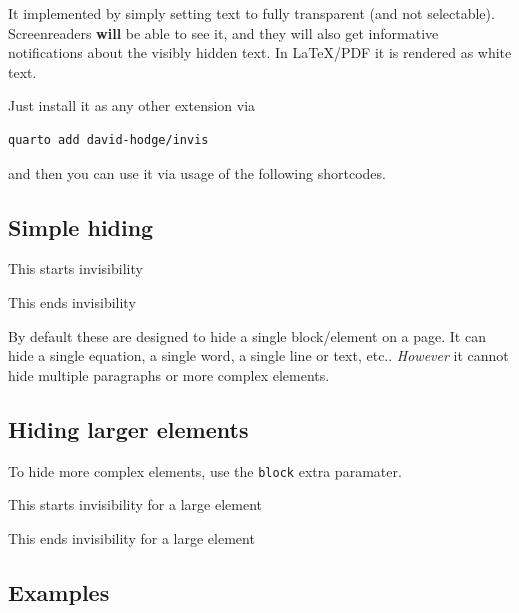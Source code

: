 \documentclass[
  a4paper,
  DIV=11,
  numbers=noendperiod,
  oneside]{scrreport}
\providecommand{\tightlist}{%
  \setlength{\itemsep}{0pt}\setlength{\parskip}{0pt}}
\begin{document}
It implemented by simply setting text to fully transparent (and not
selectable). Screenreaders \textbf{will} be able to see it, and they
will also get informative notifications about the visibly hidden text.
In LaTeX/PDF it is rendered as white text.

Just install it as any other extension via

\begin{verbatim}
quarto add david-hodge/invis
\end{verbatim}

and then you can use it via usage of the following shortcodes.

\subsection{Simple hiding}\label{simple-hiding}

\begin{description}
\tightlist
\item[\texttt{\{\{\textless{}\ invis\ start\ \textgreater{}\}\}}]
This starts invisibility
\item[\texttt{\{\{\textless{}\ invis\ end\ \textgreater{}\}\}}]
This ends invisibility
\end{description}

By default these are designed to hide a single block/element on a page.
It can hide a single equation, a single word, a single line or text,
etc.. \emph{However} it cannot hide multiple paragraphs or more complex
elements.

\subsection{Hiding larger elements}\label{hiding-larger-elements}

To hide more complex elements, use the \texttt{block} extra paramater.

\begin{description}
\tightlist
\item[\texttt{\{\{\textless{}\ invis\ start\ block\ \textgreater{}\}\}}]
This starts invisibility for a large element
\item[\texttt{\{\{\textless{}\ invis\ end\ block\ \textgreater{}\}\}}]
This ends invisibility for a large element
\end{description}

\subsection{Examples}\label{examples}
\end{document}
